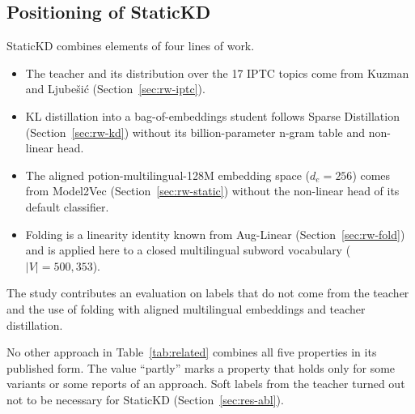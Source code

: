 \documentclass{ieeeaccess}
\begin{document}
\subsection{Positioning of StaticKD}
StaticKD combines elements of four lines of work.
\begin{itemize}
  \item The teacher and its distribution over the 17 IPTC topics come from Kuzman and Ljube\v{s}i\'c (Section~\ref{sec:rw-iptc}).
  \item KL distillation into a bag-of-embeddings student follows Sparse Distillation (Section~\ref{sec:rw-kd}) without its billion-parameter n-gram table and non-linear head.
  \item The aligned potion-multilingual-128M embedding space ($d_e=256$) comes from Model2Vec (Section~\ref{sec:rw-static}) without the non-linear head of its default classifier.
  \item Folding is a linearity identity known from Aug-Linear (Section~\ref{sec:rw-fold}) and is applied here to a closed multilingual subword vocabulary ($|V|=500{,}353$).
\end{itemize}
The study contributes an evaluation on labels that do not come from the teacher and the use of folding with aligned multilingual embeddings and teacher distillation.

No other approach in Table~\ref{tab:related} combines all five properties in its published form. The value ``partly'' marks a property that holds only for some variants or some reports of an approach. Soft labels from the teacher turned out not to be necessary for StaticKD (Section~\ref{sec:res-abl}).
\end{document}
